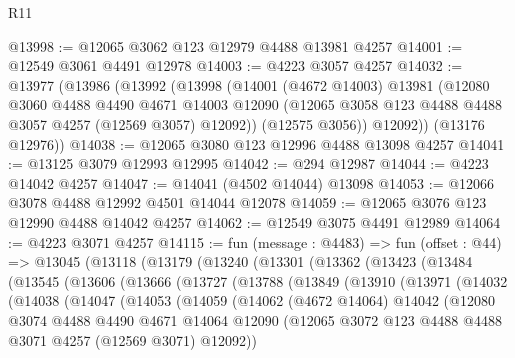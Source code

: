 \begin{lexlean}{R11}
\begin{coremodule}
@13998 := @12065 @3062 @123 @12979 @4488 @13981 @4257
@14001 := @12549 @3061 @4491 @12978
@14003 := @4223 @3057 @4257
@14032 := @13977
    (@13986
      (@13992
        (@13998
          (@14001
            (@4672 @14003)
            @13981
            (@12080
              @3060
              @4488
              @4490
              @4671
              @14003
              @12090
              (@12065 @3058 @123 @4488 @4488 @3057 @4257 (@12569 @3057) @12092))
            (@12575 @3056))
          @12092))
      (@13176 @12976))
@14038 := @12065 @3080 @123 @12996 @4488 @13098 @4257
@14041 := @13125 @3079 @12993 @12995
@14042 := @294 @12987
@14044 := @4223 @14042 @4257
@14047 := @14041 (@4502 @14044) @13098
@14053 := @12066 @3078 @4488 @12992 @4501 @14044 @12078
@14059 := @12065 @3076 @123 @12990 @4488 @14042 @4257
@14062 := @12549 @3075 @4491 @12989
@14064 := @4223 @3071 @4257
@14115 := fun (message : @4483) =>
  fun (offset : @44) =>
  @13045
    (@13118
      (@13179
        (@13240
          (@13301
            (@13362
              (@13423
                (@13484
                  (@13545
                    (@13606
                      (@13666
                        (@13727
                          (@13788
                            (@13849
                              (@13910
                                (@13971
                                  (@14032
                                    (@14038
                                      (@14047
                                        (@14053
                                          (@14059
                                            (@14062
                                              (@4672 @14064)
                                              @14042
                                              (@12080
                                                @3074
                                                @4488
                                                @4490
                                                @4671
                                                @14064
                                                @12090
                                                (@12065
                                                  @3072
                                                  @123
                                                  @4488
                                                  @4488
                                                  @3071
                                                  @4257
                                                  (@12569 @3071)
                                                  @12092))

\end{coremodule}
\end{lexlean}
